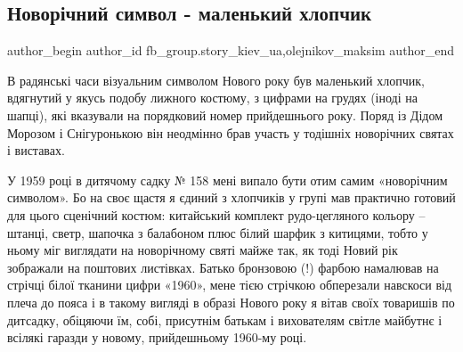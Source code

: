  
 
 
 
 
 
\subsection{Новорічний символ - маленький хлопчик}
\label{sec:27_12_2021.fb.fb_group.story_kiev_ua.2.novyj_god_malchik}
 
\ifcmt
 author_begin
   author_id fb_group.story_kiev_ua,olejnikov_maksim
 author_end
\fi

В радянські часи візуальним символом Нового року був маленький хлопчик,
вдягнутий у якусь подобу лижного костюму, з цифрами на грудях (іноді на шапці),
які вказували на порядковий номер прийдешнього року. Поряд із Дідом Морозом і
Снігуронькою він неодмінно брав участь у тодішніх новорічних святах і виставах.

\begin{multicols}{2} %
\setlength{\parindent}{0pt}



\end{multicols} %

У 1959 році в дитячому садку № 158 мені випало бути отим самим «новорічним
символом». Бо на своє щастя я єдиний з хлопчиків у групі мав практично готовий
для цього сценічний костюм: китайський комплект рудо-цегляного кольору –
штанці, светр, шапочка з балабоном плюс білий шарфик з китицями, тобто у ньому
міг виглядати на новорічному святі майже так, як тоді Новий рік зображали на
поштових листівках. Батько бронзовою (!) фарбою намалював на стрічці білої
тканини цифри «1960», мене тією стрічкою обперезали навскоси від плеча до пояса
і в такому вигляді в образі Нового року я вітав своїх товаришів по дитсадку,
обіцяючи їм, собі, присутнім батькам і вихователям  світле майбутнє і всілякі
гаразди у новому, прийдешньому 1960-му році. 

